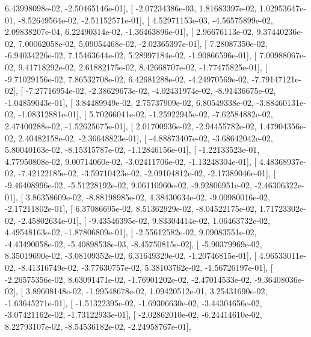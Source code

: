 \documentclass{article}
\begin{document}
          6.43998098e-02,  -2.50465146e-01],
       [ -2.07234386e-03,   1.81683397e-02,   1.02953647e-01,
         -8.52649564e-02,  -2.51152571e-01],
       [  4.52971153e-03,  -4.56575899e-02,   2.09838207e-04,
          6.22490314e-02,  -1.36463896e-01],
       [  2.96676113e-02,   9.37440236e-02,   7.00062058e-02,
          5.09054468e-02,  -2.02365397e-01],
       [  7.28087350e-02,  -6.94034226e-02,   7.15463644e-02,
          5.28997184e-02,  -1.90866596e-01],
       [  7.00988067e-02,   9.41718292e-02,   2.61882175e-02,
          8.42668707e-02,  -1.77475825e-01],
       [ -9.71029156e-02,   7.86532708e-02,   6.42681288e-02,
         -4.24970569e-02,  -7.79147121e-02],
       [ -7.27716954e-02,  -2.38629673e-02,  -4.02431974e-02,
         -8.91436675e-02,  -1.04859043e-01],
       [  3.84489949e-02,   2.75737909e-02,   6.80549338e-02,
         -3.88460131e-02,  -1.08312881e-01],
       [  5.70266041e-02,  -1.25922945e-02,  -7.62584882e-02,
          2.47400288e-02,  -1.52625675e-01],
       [  2.01700936e-02,  -2.94455782e-02,   1.47904356e-02,
          2.40482158e-02,  -2.36648823e-01],
       [ -4.88873407e-02,  -3.68642042e-02,   5.80040163e-02,
         -8.15315787e-02,  -1.12846156e-01],
       [ -1.22133523e-01,   4.77950808e-02,   9.00714060e-02,
         -3.02411706e-02,  -1.13248304e-01],
       [  4.48368937e-02,  -7.42122185e-02,  -3.59710423e-02,
         -2.09104812e-02,  -2.17389046e-01],
       [ -9.46408996e-02,  -5.51228192e-02,   9.06110960e-02,
         -9.92806951e-02,  -2.46306322e-01],
       [  3.86358609e-02,  -8.88198985e-02,   4.38430634e-02,
         -9.00980016e-02,  -2.17211802e-01],
       [  6.37086695e-02,   8.51362929e-02,  -8.04522175e-02,
          1.71723302e-02,  -2.45802634e-01],
       [ -9.43546395e-02,   9.83304414e-02,   1.06463732e-02,
          4.49548163e-02,  -1.87806809e-01],
       [ -2.55612582e-02,   9.09083551e-02,  -4.43490058e-02,
         -5.40898538e-03,  -8.45750815e-02],
       [ -5.90379969e-02,   8.35019690e-02,  -3.08109352e-02,
          6.31649329e-02,  -1.20746815e-01],
       [  4.96533011e-02,  -8.41316749e-02,  -3.77630757e-02,
          5.38103762e-02,  -1.56726197e-01],
       [ -2.26575356e-02,   8.63091471e-02,  -1.76901202e-02,
         -2.47014533e-02,  -9.36408036e-02],
       [  3.89608148e-02,  -1.99548678e-02,   1.09420512e-01,
          3.25431690e-02,  -1.63645271e-01],
       [ -1.51322395e-02,  -1.69306630e-02,  -3.44304656e-02,
         -3.07421162e-02,  -1.73122933e-01],
       [ -2.02862010e-02,  -6.24414610e-02,   8.22793107e-02,
         -8.54536182e-02,  -2.24958767e-01],
\end{document}

